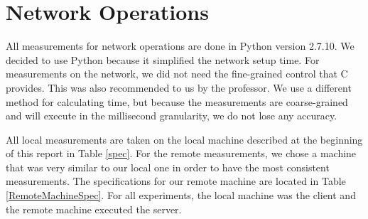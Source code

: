 \documentclass[sigconf]{acmart}
\begin{document}
\section{Network Operations}
All measurements for network operations are done in Python version 2.7.10. We decided to use Python because it simplified the network setup time. For measurements on the network, we did not need the fine-grained control that C provides. This was also recommended to us by the professor. We use a different method for calculating time, but because the measurements are coarse-grained and will execute in the millisecond granularity, we do not lose any accuracy.

All local measurements are taken on the local machine described at the beginning of this report in Table \ref{spec}. For the remote measurements, we chose a machine that was very similar to our local one in order to have the most consistent measurements. The specifications for our remote machine are located in Table \ref{RemoteMachineSpec}. For all experiments, the local machine was the client and the remote machine executed the server.
\end{document}
